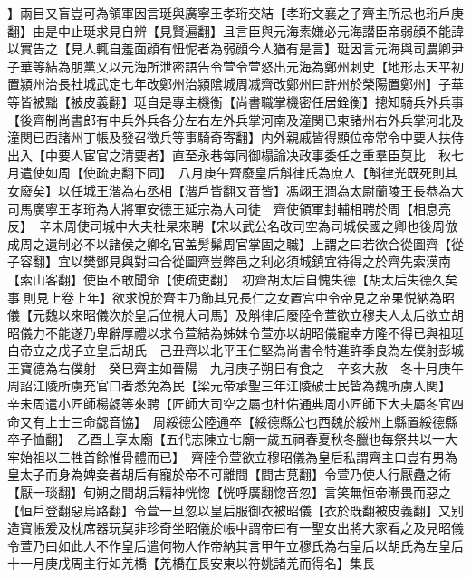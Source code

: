 】兩目又盲豈可為領軍因言珽與廣寧王孝珩交結【孝珩文襄之子齊主所忌也珩戶庚翻】由是中止珽求見自辨【見賢遍翻】且言臣與元海素嫌必元海譛臣帝弱顔不能諱以實告之【見人輒自羞面顔有忸怩者為弱顔今人猶有是言】珽因言元海與司農卿尹子華等結為朋黨又以元海所泄密語告令萱令萱怒出元海為鄭州刺史【地形志天平初置潁州治長社城武定七年改鄭州治潁隂城周㓕齊改鄭州曰許州於榮陽置鄭州】子華等皆被黜【被皮義翻】珽自是專主機衡【尚書職掌機密任居銓衡】摠知騎兵外兵事【後齊制尚書郎有中兵外兵各分左右左外兵掌河南及潼関已東諸州右外兵掌河北及潼関已西諸州丁帳及發召徵兵等事騎奇寄翻】内外親戚皆得顯位帝常令中要人扶侍出入【中要人宦官之清要者】直至永巷每同御榻論决政事委任之重羣臣莫比　秋七月遣使如周【使疏吏翻下同】　八月庚午齊廢皇后斛律氏為庶人【斛律光既死則其女廢矣】以任城王湝為右丞相【湝戶皆翻又音皆】馮翊王潤為太尉蘭陵王長恭為大司馬廣寧王孝珩為大將軍安德王延宗為大司徒　齊使領軍封輔相聘於周【相息亮反】　辛未周使司城中大夫杜杲來聘【宋以武公名改司空為司城侯國之卿也後周倣成周之遺制必不以諸侯之卿名官盖髣髴周官掌固之職】上謂之曰若欲合從圖齊【從子容翻】宜以樊鄧見與對曰合從圖齊豈弊邑之利必須城鎮宜待得之於齊先索漢南【索山客翻】使臣不敢聞命【使疏吏翻】　初齊胡太后自愧失德【胡太后失德久矣事則見上卷上年】欲求悅於齊主乃飾其兄長仁之女置宫中令帝見之帝果悦納為昭儀【元魏以來昭儀次於皇后位視大司馬】及斛律后廢陸令萱欲立穆夫人太后欲立胡昭儀力不能遂乃卑辭厚禮以求令萱結為姊妹令萱亦以胡昭儀寵幸方隆不得已與祖珽白帝立之戊子立皇后胡氏　己丑齊以北平王仁堅為尚書令特進許季良為左僕射彭城王寶德為右僕射　癸巳齊主如晉陽　九月庚子朔日有食之　辛亥大赦　冬十月庚午周詔江陵所虜充官口者悉免為民【梁元帝承聖三年江陵破士民皆為魏所虜入関】　辛未周遣小匠師楊勰等來聘【匠師大司空之屬也杜佑通典周小匠師下大夫屬冬官四命又有上士三命勰音恊】　周綏德公陸通卒【綏德縣公也西魏於綏州上縣置綏德縣卒子恤翻】　乙酉上享太廟【五代志陳立七廟一歲五祠春夏秋冬臘也每祭共以一大牢始祖以三牲首餘惟骨體而已】　齊陸令萱欲立穆昭儀為皇后私謂齊主曰豈有男為皇太子而身為婢妾者胡后有寵於帝不可離間【間古莧翻】令萱乃使人行厭蠱之術【厭一琰翻】旬朔之間胡后精神恍惚【恍呼廣翻惚音忽】言笑無恒帝漸畏而惡之【恒戶登翻惡烏路翻】令萱一旦忽以皇后服御衣被昭儀【衣於既翻被皮義翻】又别造寶帳爰及枕席器玩莫非珍奇坐昭儀於帳中謂帝曰有一聖女出將大家看之及見昭儀令萱乃曰如此人不作皇后遣何物人作帝納其言甲午立穆氏為右皇后以胡氏為左皇后十一月庚戌周主行如羌橋【羌橋在長安東以符姚諸羌而得名】集長

